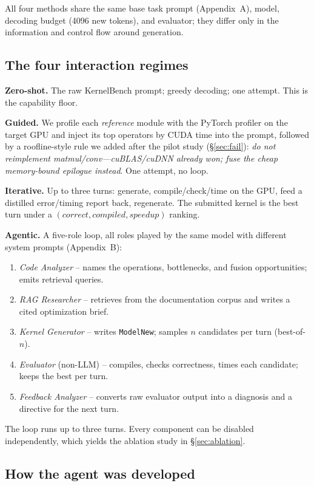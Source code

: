 \documentclass[conference]{IEEEtran}
\begin{document}
All four methods share the same base task prompt (Appendix~A), model, decoding
budget (4096 new tokens), and evaluator; they differ only in the information and
control flow around generation.

\subsection{The four interaction regimes}

\textbf{Zero-shot.} The raw KernelBench prompt; greedy decoding; one attempt. This
is the capability floor.

\textbf{Guided.} We profile each \emph{reference} module with the PyTorch profiler
on the target GPU and inject its top operators by CUDA time into the prompt,
followed by a roofline-style rule we added after the pilot study (\S\ref{sec:fail}):
\emph{do not reimplement matmul/conv---cuBLAS/cuDNN already won; fuse the cheap
memory-bound epilogue instead}. One attempt, no loop.

\textbf{Iterative.} Up to three turns: generate, compile/check/time on the GPU,
feed a distilled error/timing report back, regenerate. The submitted kernel is the
best turn under a $(\textit{correct},\textit{compiled},\textit{speedup})$ ranking.

\textbf{Agentic.} A five-role loop, all roles played by the same model with
different system prompts (Appendix~B):
\begin{enumerate}
  \item \emph{Code Analyzer} -- names the operations, bottlenecks, and fusion
        opportunities; emits retrieval queries.
  \item \emph{RAG Researcher} -- retrieves from the documentation corpus and writes
        a cited optimization brief.
  \item \emph{Kernel Generator} -- writes \texttt{ModelNew}; samples $n$ candidates
        per turn (best-of-$n$).
  \item \emph{Evaluator} (non-LLM) -- compiles, checks correctness, times each
        candidate; keeps the best per turn.
  \item \emph{Feedback Analyzer} -- converts raw evaluator output into a diagnosis
        and a directive for the next turn.
\end{enumerate}
The loop runs up to three turns. Every component can be disabled independently,
which yields the ablation study in \S\ref{sec:ablation}.

\subsection{How the agent was developed}\label{sec:iterate}
\end{document}
